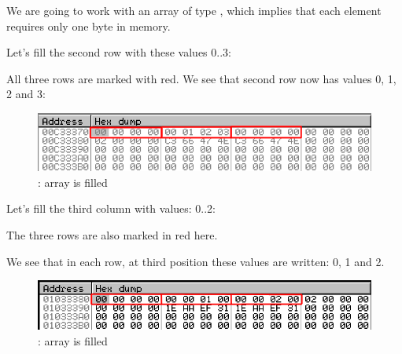 
We are going to work with an array of type \Tchar, which implies that each element requires only one 
byte in memory.

\myindex{\olly}

Let's fill the second row with these values 0..3:



All three rows are marked with red. 
We see that second row now has values 0, 1, 2 and 3:

\begin{figure}[H]
\centering
\includegraphics[scale=\NormalScale]{patterns/13_arrays/5_multidimensional/olly_2D_1.png}
\caption{\olly: array is filled}
\end{figure}

\myindex{\olly}

Let's fill the third column with values: 0..2:



The three rows are also marked in red here. 

We see that in each row, at third position these values are written: 0, 1 and 2.

\begin{figure}[H]
\centering
\includegraphics[scale=\NormalScale]{patterns/13_arrays/5_multidimensional/olly_2D_2.png}
\caption{\olly: array is filled}
\end{figure}


